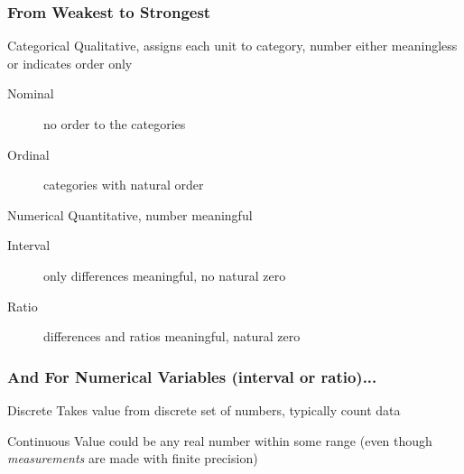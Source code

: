 \documentclass[handout]{beamer}
\begin{document}
\begin{frame}
\frametitle{From Weakest to Strongest}
\begin{block}{Categorical}
Qualitative, assigns each unit to category, number either meaningless or indicates order only \pause
		\begin{description}
			\item[Nominal] no order to the categories  \pause
			\item[Ordinal]  categories with natural order \pause
		\end{description}
\end{block}
\begin{block}{Numerical}
Quantitative, number meaningful \pause
		\begin{description}
			\item[Interval] only differences meaningful, no natural zero \pause
			\item[Ratio] differences and ratios meaningful, natural zero 
		\end{description}
\end{block}

\end{frame}


\begin{frame}
\frametitle{And For Numerical Variables (interval or ratio)...}
\begin{block}{Discrete}
Takes value from discrete set of numbers, typically count data
\end{block}
\pause
\begin{block}{Continuous}
Value could be any real number within some range (even though \emph{measurements} are made with finite precision)
\end{block}

\end{frame}

\end{document}
